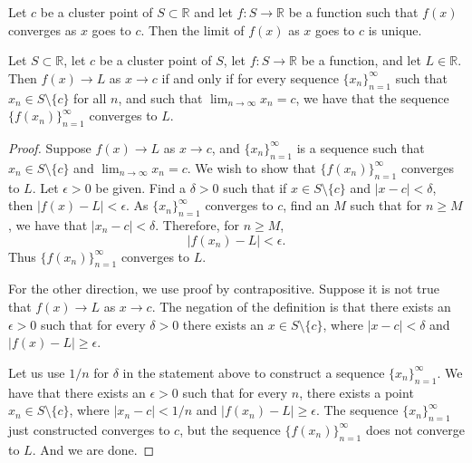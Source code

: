 \documentclass[../main.tex]{subfiles}
\begin{document}
    \begin{proposition}
    Let $c$ be a cluster point of $S \subset \mathbb{R}$ and let $f : S \to \mathbb{R}$ be a function such that $f(x)$ converges as $x$ goes to $c$. Then the limit of $f(x)$ as $x$ goes to $c$ is unique.
    \end{proposition}
        
    
    
    \begin{lemma}
        Let $S \subset \mathbb{R}$, let $c$ be a cluster point of $S$, let $f : S \to \mathbb{R}$ be a function, and let $L \in \mathbb{R}$. Then $f(x) \to L$ as $x \to c$ if and only if for every sequence $\{x_n\}_{n=1}^{\infty}$ such that $x_n \in S \setminus \{c\}$ for all $n$, and such that $\lim_{n\to\infty} x_n = c$, we have that the sequence $\{f(x_n)\}_{n=1}^{\infty}$ converges to $L$.
    \end{lemma}
        
    \begin{proof}
        Suppose $f(x) \to L$ as $x \to c$, and $\{x_n\}_{n=1}^{\infty}$ is a sequence such that $x_n \in S \setminus \{c\}$ and $\lim_{n\to\infty} x_n = c$. We wish to show that $\{f(x_n)\}_{n=1}^{\infty}$ converges to $L$. Let $\epsilon > 0$ be given. Find a $\delta > 0$ such that if $x \in S \setminus \{c\}$ and $|x - c| < \delta$, then $|f(x) - L| < \epsilon$. As $\{x_n\}_{n=1}^{\infty}$ converges to $c$, find an $M$ such that for $n \geq M$, we have that $|x_n - c| < \delta$. Therefore, for $n \geq M$,
        \[
        |f(x_n) - L| < \epsilon.
        \]
        Thus $\{f(x_n)\}_{n=1}^{\infty}$ converges to $L$.
        
        For the other direction, we use proof by contrapositive. Suppose it is not true that $f(x) \to L$ as $x \to c$. The negation of the definition is that there exists an $\epsilon > 0$ such that for every $\delta > 0$ there exists an $x \in S \setminus \{c\}$, where $|x - c| < \delta$ and $|f(x) - L| \geq \epsilon$.
        
        Let us use $1/n$ for $\delta$ in the statement above to construct a sequence $\{x_n\}_{n=1}^{\infty}$. We have that there exists an $\epsilon > 0$ such that for every $n$, there exists a point $x_n \in S \setminus \{c\}$, where $|x_n - c| < 1/n$ and $|f(x_n) - L| \geq \epsilon$. The sequence $\{x_n\}_{n=1}^{\infty}$ just constructed converges to $c$, but the sequence $\{f(x_n)\}_{n=1}^{\infty}$ does not converge to $L$. And we are done. 
    \end{proof}
        
\end{document}
